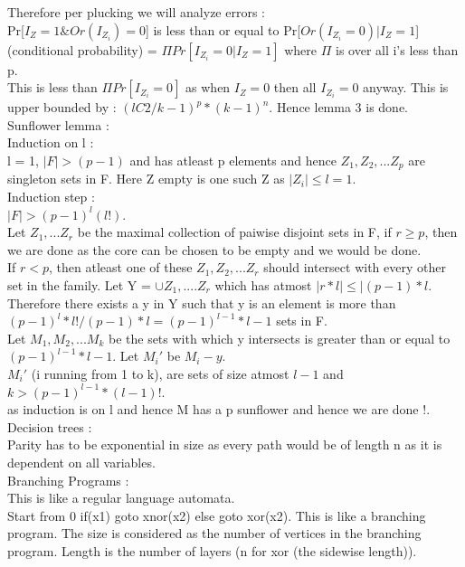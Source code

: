 \documentclass[solution,addpoints,12pt]{exam}
\begin{document}
Therefore per plucking we will analyze errors :\\
Pr[$I_Z = 1 \& Or(I_{Z_i}) = 0$] is less than or equal to
Pr[$Or(I_{Z_i} = 0) | I_Z = 1$] (conditional probability) =
$\Pi Pr[I_{Z_i} = 0 | I_Z = 1]$ where $\Pi$ is over all i's less than p.\\
This is less than $\Pi Pr[I_{Z_i} = 0]$ as when $I_Z = 0$ then all $I_{Z_i} = 0$
anyway. This is upper bounded by : ${(lC2/k-1)}^p*(k-1)^n$. Hence lemma 3
is done.\\

Sunflower lemma :\\
Induction on l :\\
l = 1, $|F| > (p-1)$ and has atleast p elements and hence $Z_1, Z_2, ... Z_p$
are singleton sets in F. Here Z empty is one such Z as $|Z_i| \le l = 1$.\\
Induction step :\\
$|F| > (p-1)^l(l!)$.\\
Let $Z_1, ... Z_r$ be the maximal collection of paiwise disjoint sets in F,
if $r \ge p$, then we are done as the core can be chosen to be empty and we would
be done.\\
If $r < p$, then atleast one of these $Z_1, Z_2, ... Z_r$ should intersect
with every other set in the family. Let Y = $\cup Z_1, .... Z_r$ which has
atmost $|r*l| \le |(p-1)*l$. Therefore there exists a y in Y such that y is an
element is more than ${(p-1)}^l*l!/(p-1)*l = {(p-1)}^{l-1}*{l-1}$ sets in F.\\
Let $M_1, M_2, ... M_k$ be the sets with which y intersects is greater than
or equal to ${(p-1)}^{l-1}*{l-1}$. Let $M_i'$ be $M_i - y$.\\
$M_i'$ (i running from 1 to k), are sets of size atmost $l-1$ and $k > (p-1)^{l-1}*(l-1)!$.\\
as induction is on l and hence M has a p sunflower and hence we are done !.\\

Decision trees :\\
Parity has to be exponential in size as every path would be of length n
as it is dependent on all variables.\\

Branching Programs :\\
This is like a regular language automata.\\
Start from 0 if(x1) goto xnor(x2) else goto xor(x2). This is like
a branching program. The size is considered as the number of
vertices in the branching program. Length is the number of
layers (n for xor (the sidewise length)).\\
\end{document}
